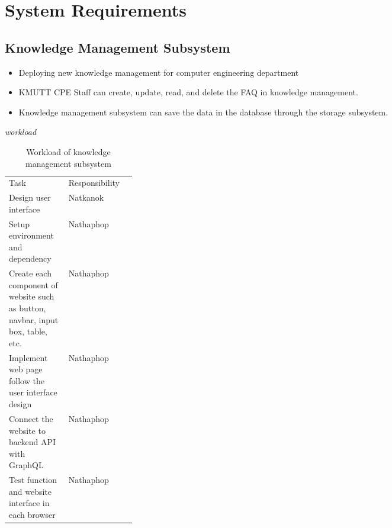 \documentclass[12pt,oneside,openright,a4paper]{cpe-english-project}
\begin{document}
\section{System Requirements}
	\subsection{Knowledge Management Subsystem}
	\begin{itemize}
		\item Deploying new knowledge management for computer engineering department
		\item KMUTT CPE Staff can create, update, read, and delete the FAQ in knowledge management.
		\item Knowledge management subsystem can save the data in the database through the storage subsystem.
	\end{itemize}
\emph{workload}
\begin{table}[h]
	\centering
	\caption{Workload of knowledge management subsystem}
	\label{tab:Workload of knowledge management subsystem}
\begin{adjustbox}{width=\textwidth}
\begin{tabular}{lp{0.25\linewidth}l}
		\rowcolor[HTML]{5B9BD5} 
		Task                                                                              & Responsibility \\
		\rowcolor[HTML]{DEEAF6} 
		Design user interface                                                             & Natkanok       \\
		\rowcolor[HTML]{FFFFFF} 
		Setup environment and dependency                                                  & Nathaphop      \\
		\rowcolor[HTML]{DEEAF6} 
		Create each component of website such as button, navbar, input   box, table, etc. & Nathaphop      \\
		Implement web page follow the user interface   design                             & Nathaphop      \\
		\rowcolor[HTML]{DEEAF6} 
		Connect the website to backend API with   GraphQL                                 & Nathaphop      \\
		Test function and website interface in each   browser                             & Nathaphop      
	\end{tabular}
\end{adjustbox}
\end{table}
\end{document}
